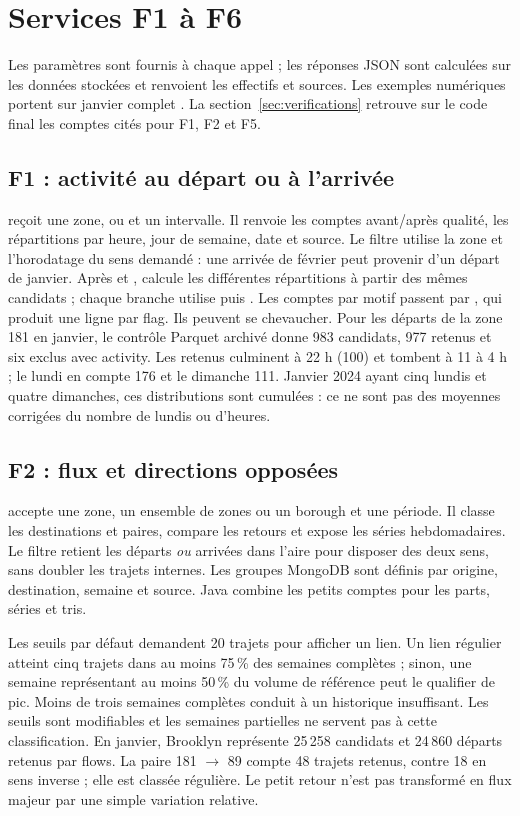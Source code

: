 \section{Services F1 à F6}\label{sec:services}
Les paramètres sont fournis à chaque appel ; les réponses JSON sont calculées
sur les données stockées et renvoient les effectifs et sources. Les exemples numériques portent sur janvier complet \cite{mesures}. La section~\ref{sec:verifications} retrouve sur le code final les comptes cités pour F1, F2 et F5.

\subsection{F1 : activité au départ ou à l'arrivée}
 reçoit une zone,  ou  et un
intervalle. Il renvoie les comptes avant/après qualité, les répartitions par heure,
jour de semaine, date et source. Le filtre utilise la zone et l'horodatage du
sens demandé : une arrivée de février peut provenir d'un départ de janvier.
Après  et ,  calcule les différentes
répartitions à partir des mêmes candidats ; chaque branche utilise
 puis . Les comptes par motif passent par
, qui produit une ligne par flag. Ils peuvent se chevaucher.
Pour les départs de la zone 181 en janvier, le contrôle Parquet archivé donne
983 candidats, 977 retenus et six exclus avec activity. Les retenus culminent à 22 h (100) et tombent à 11 à 4 h ; le lundi en compte 176 et le dimanche 111. Janvier 2024 ayant cinq lundis et quatre dimanches, ces distributions sont cumulées : ce ne sont pas des moyennes corrigées du nombre de lundis ou d'heures.

\subsection{F2 : flux et directions opposées}
 accepte une zone, un ensemble de zones ou un borough et
une période. Il classe les destinations et paires, compare les retours et expose
les séries hebdomadaires. Le filtre  retient les départs \emph{ou}
arrivées dans l'aire pour disposer des deux sens, sans doubler les trajets internes.
Les groupes MongoDB sont définis par origine, destination, semaine et source.
Java combine les petits comptes pour les parts, séries et tris.

Les seuils par défaut demandent 20 trajets pour afficher un lien. Un lien régulier
atteint cinq trajets dans au moins 75\,\% des semaines complètes ; sinon, une
semaine représentant au moins 50\,\% du volume de référence peut le qualifier
de pic. Moins de trois semaines complètes conduit à un historique insuffisant.
Les seuils sont modifiables et les semaines partielles ne servent pas à cette
classification. En janvier, Brooklyn représente 25\,258 candidats et
24\,860 départs retenus par flows. La paire 181 $\to$ 89 compte 48 trajets retenus,
contre 18 en sens inverse ; elle est classée régulière. Le petit retour n'est
pas transformé en flux majeur par une simple variation relative.


